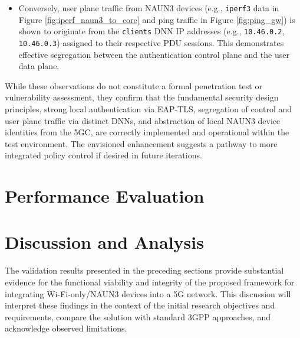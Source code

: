 \begin{itemize}
{\begin{itemize}
\begin{lstlisting}[caption=hostapd failing due to wrong local address,label={lst:hostapd_fail}]
(...)
25 | 1748702388.755637: RADIUS local address: 10.0.2.15:42579
(...)
216| 1748702566.372520: RADIUS local address: 10.45.0.2:50371
(...)
\end{lstlisting}

            \item Conversely, user plane traffic from \ac{NAUN3} devices (e.g., \texttt{iperf3} data in Figure \ref{fig:iperf_naun3_to_core} and ping traffic in Figure \ref{fig:ping_gw}) is shown to originate from the \texttt{clients} \ac{DNN} \ac{IP} addresses (e.g., \texttt{10.46.0.2}, \texttt{10.46.0.3}) assigned to their respective \ac{PDU} sessions. This demonstrates effective segregation between the authentication control plane and the user data plane.
        \end{itemize}
    }
\end{itemize}

While these observations do not constitute a formal penetration test or vulnerability assessment, they confirm that the fundamental security design principles, strong local authentication via \ac{EAP-TLS}, segregation of control and user plane traffic via distinct \acp{DNN}, and abstraction of local \ac{NAUN3} device identities from the \ac{5GC}, are correctly implemented and operational within the test environment. The envisioned enhancement suggests a pathway to more integrated policy control if desired in future iterations.

\section{Performance Evaluation}



\section{Discussion and Analysis}

The validation results presented in the preceding sections provide substantial evidence for the functional viability and integrity of the proposed framework for integrating Wi-Fi-only/\ac{NAUN3} devices into a \ac{5G} network. This discussion will interpret these findings in the context of the initial research objectives and requirements, compare the solution with standard \ac{3GPP} approaches, and acknowledge observed limitations.


